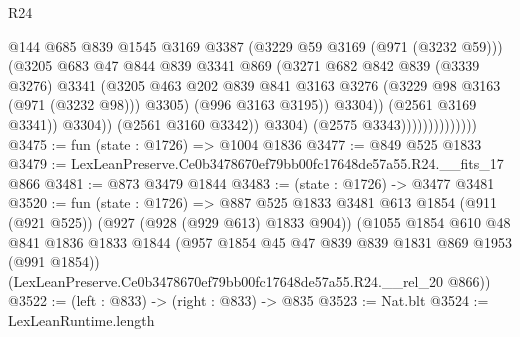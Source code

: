 \begin{lexlean}{R24}
\begin{coremodule}
                                          @144
                                          @685
                                          @839
                                          @1545
                                          @3169
                                          @3387
                                          (@3229 @59 @3169 (@971 (@3232 @59)))
                                          (@3205
                                            @683
                                            @47
                                            @844
                                            @839
                                            @3341
                                            @869
                                            (@3271
                                              @682
                                              @842
                                              @839
                                              (@3339 @3276)
                                              @3341
                                              (@3205
                                                @463
                                                @202
                                                @839
                                                @841
                                                @3163
                                                @3276
                                                (@3229 @98 @3163 (@971 (@3232 @98)))
                                                @3305)
                                              (@996 @3163 @3195))
                                            @3304))
                                        (@2561 @3169 @3341))
                                      @3304))
                                  (@2561 @3160 @3342))
                                @3304)
                              (@2575 @3343))))))))))))))
@3475 := fun (state : @1726) => @1004 @1836
@3477 := @849 @525 @1833
@3479 := LexLeanPreserve.Ce0b3478670ef79bb00fc17648de57a55.R24.__fits_17 @866
@3481 := @873 @3479 @1844
@3483 := (state : @1726) -> @3477 @3481
@3520 := fun (state : @1726) =>
  @887
    @525
    @1833
    @3481
    @613
    @1854
    (@911 (@921 @525))
    (@927 (@928 (@929 @613) @1833 @904))
    (@1055
      @1854
      @610
      @48
      @841
      @1836
      @1833
      @1844
      (@957 @1854 @45 @47 @839 @839 @1831 @869 @1953 (@991 @1854))
      (LexLeanPreserve.Ce0b3478670ef79bb00fc17648de57a55.R24.__rel_20 @866))
@3522 := (left : @833) -> (right : @833) -> @835
@3523 := Nat.blt
@3524 := LexLeanRuntime.length

\end{coremodule}
\end{lexlean}
